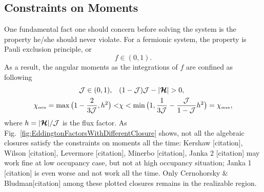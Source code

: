 \subsection{Constraints on Moments}
One fundamental fact one should concern before solving the system is the property he/she should never violate.
For a fermionic system, the property is Pauli exclusion principle, or 
\begin{equation}
f \in (0,1).
\end{equation}
As a result, the angular moments as the integrations of $f$ are confined as following
\begin{align}
\mathcal{J} \in(0,1), \quad &(1-\mathcal{J})\mathcal{J}-|\boldsymbol{\mathcal{H}}|  > 0, \\
  \chi_{\mbox{\tiny min}}
  =\max\big(1-\frac{2}{3\mathcal{J}},h^{2}\big)
  < & \chi<\min\big(1,\frac{1}{3\mathcal{J}}-\frac{\mathcal{J}}{1-\mathcal{J}}h^{2}\big)=\chi_{\mbox{\tiny max}},
  \label{eq:eddingtonFactorBounds}
\end{align}
where $h = |\boldsymbol{\mathcal{H}}|/\mathcal{J}$ is the flux factor.
As Fig.~\eqref{fig:EddingtonFactorsWithDifferentClosure} shows, not all the algebraic closures satisfy the constraints on moments all the time: Kershaw [citation], Wilson [citation], Levermore [citation], Minerbo [citation], Janka 2 [citation] may work fine at low occupancy case, but not at high occupancy situation; Janka 1 [citation] is even worse and not work all the time. Only Cernohorsky \& Bludman[citation] among these plotted closures remains in the realizable region.
